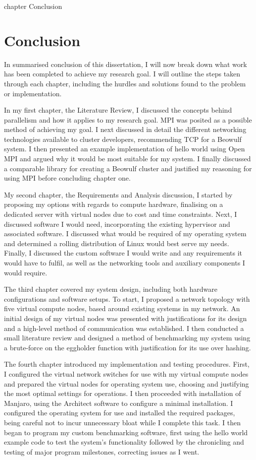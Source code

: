 \cleardoublepage
{}
{}
    {chapter}
    {Conclusion}

\chapter*{Conclusion}
In summarised conclusion of this dissertation, I will now break down what work has been completed to achieve my research goal. I will outline the steps taken through each chapter, including the hurdles and solutions found to the problem or implementation.

In my first chapter, the Literature Review, I discussed the concepts behind parallelism and how it applies to my research goal. MPI was posited as a possible method of achieving my goal. I next discussed in detail the different networking technologies available to cluster developers, recommending TCP for a Beowulf system. I then presented an example implementation of hello world using Open MPI and argued why it would be most suitable for my system. I finally discussed a comparable library for creating a Beowulf cluster and justified my reasoning for using MPI before concluding chapter one.

My second chapter, the Requirements and Analysis discussion, I started by proposing my options with regards to compute hardware, finalising on a dedicated server with virtual nodes due to cost and time constraints. Next, I discussed software I would need, incorporating the existing hypervisor and associated software. I discussed what would be required of my operating system and determined a rolling distribution of Linux would best serve my needs. Finally, I discussed the custom software I would write and any requirements it would have to fulfil, as well as the networking tools and auxiliary components I would require.

The third chapter covered my system design, including both hardware configurations and software setups. To start, I proposed a network topology with five virtual compute nodes, based around existing systems in my network. An initial design of my virtual nodes was presented with justifications for its design and a high-level method of communication was established. I then conducted a small literature review and designed a method of benchmarking my system using a brute-force on the eggholder function with justification for its use over hashing.

The fourth chapter introduced my implementation and testing procedures. First, I configured the virtual network switches for use with my virtual compute nodes and prepared the virtual nodes for operating system use, choosing and justifying the most optimal settings for operations. I then proceeded with installation of Manjaro, using the Architect software to configure a minimal installation. I configured the operating system for use and installed the required packages, being careful not to incur unnecessary bloat while I complete this task. I then began to program my custom benchmarking software, first using the hello world example code to test the system's functionality followed by the chronicling and testing of major program milestones, correcting issues as I went.

